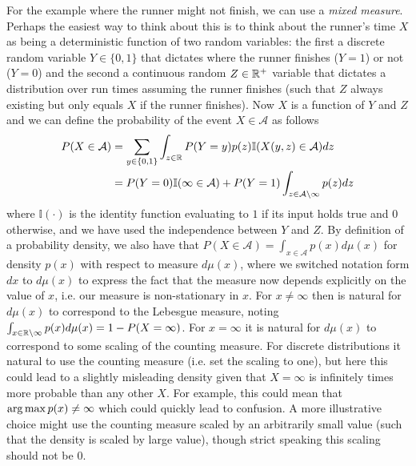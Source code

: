For the example where the runner might not finish, we can
use a \emph{mixed measure}.  Perhaps the easiest way to think about this is to think about
the runner's time $X$ as being a deterministic function of two random variables: the first
a discrete random variable $Y\in\{0,1\}$ that dictates where the runner finishes ($Y=1$) or not ($Y=0$) and the second 
a continuous random $Z\in\mathbb{R}^+$ variable that dictates a distribution over run times assuming the
runner finishes (such that $Z$ always existing but only equals $X$ if the runner finishes).  
Now $X$ is a function of $Y$ and $Z$ and we can define the probability of the event
$X\in \mathcal{A}$ as follows
\begin{align*}
P(X \in \mathcal{A}) &= \sum_{y \in \{0,1\}} \int_{z\in \mathbb{R}} P(Y=y) p(z) \mathbb{I}(X(y,z) \in \mathcal{A}) dz \\
&= P(Y=0) \mathbb{I}(\infty\in \mathcal{A})  + P(Y=1) \int_{z\in \mathcal{A}\backslash\infty} p(z) dz
\end{align*}
where $\mathbb{I}(\cdot)$ is the identity function evaluating to $1$ if its
input holds true and $0$ otherwise, and we have used the independence between 
$Y$ and $Z$.  By definition of a probability density, we also
have that $P(X \in \mathcal{A}) = \int_{x\in\mathcal{A}} p(x) d\mu(x)$ for density $p(x)$
with respect to measure $d\mu(x)$, where we switched notation form $dx$ to $d\mu(x)$ to express
the fact that the measure now depends explicitly on the value of $x$, i.e. our measure
is non-stationary in $x$.  For $x\neq\infty$ then is natural for $d\mu(x)$ to correspond to the
Lebesgue measure, noting $\int_{x\in \mathbb{R}\backslash\infty} p(x) d\mu(x) = 1-P(X=\infty)$.
For $x=\infty$ it is natural for $d\mu(x)$ to correspond to some scaling of the counting
measure.  For discrete distributions it natural to use the counting measure (i.e. set the
scaling to one), but here this could lead to a slightly misleading density given that $X=\infty$
is infinitely times more probable than any other $X$.  For example, this could mean that
$\operatorname*{arg\,max} p(x) \neq \infty$ which could quickly lead to confusion.  A more illustrative
choice might use the counting measure scaled by an arbitrarily small value (such that
the density is scaled by large value), though strict speaking this scaling should not be $0$.

